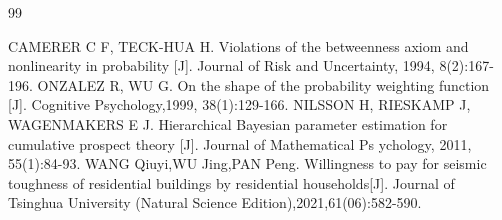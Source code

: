 \documentclass{mcmthesis}
\begin{document}
\begin{thebibliography}{99}
	
CAMERER C F, TECK-HUA H. Violations of the betweenness axiom and nonlinearity in probability [J]. Journal of Risk and Uncertainty, 1994, 8(2):167-196.
ONZALEZ R, WU G. On the shape of the probability weighting function [J]. Cognitive Psychology,1999, 38(1):129-166.
NILSSON H, RIESKAMP J, WAGENMAKERS E J. Hierarchical Bayesian parameter estimation for cumulative prospect theory [J]. Journal of Mathematical Ps ychology, 2011, 55(1):84-93.
 WANG Qiuyi,WU Jing,PAN Peng. Willingness to pay for seismic toughness of residential buildings by residential households[J]. Journal of Tsinghua University (Natural Science Edition),2021,61(06):582-590.

\end{thebibliography}
\end{document}
